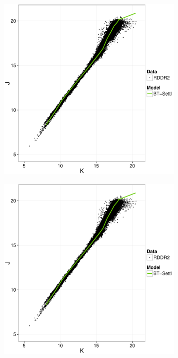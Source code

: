 \begin{figure}[ht!]
\begin{subfigure}[t]{0.45\textwidth}
        \caption{}
        \end{subfigure}
        \begin{subfigure}[t]{0.45\textwidth}
       \includegraphics[page=4,width=\textwidth]{background/Figures/BHM/BHM_vs_BT-Settl.pdf}
        \caption{}
    \end{subfigure}
    \begin{subfigure}[t]{0.45\textwidth}
     \includegraphics[page=6,width=\textwidth]{background/Figures/BHM/BHM_vs_BT-Settl.pdf}

\end{subfigure}
\end{figure}
